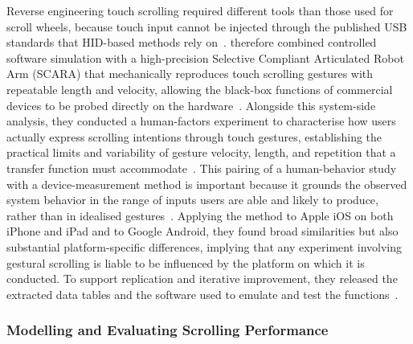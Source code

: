 \documentclass[12pt,a4paper]{report}
\begin{document}
        Reverse engineering touch scrolling required different tools than those used for scroll wheels, because touch input cannot be injected through the published USB standards that HID-based methods rely on~\cite{quinn2013touch}. \citeauthor{quinn2013touch} therefore combined controlled software simulation with a high-precision Selective Compliant Articulated Robot Arm (SCARA) that mechanically reproduces touch scrolling gestures with repeatable length and velocity, allowing the black-box functions of commercial devices to be probed directly on the hardware~\cite{quinn2013touch}. Alongside this system-side analysis, they conducted a human-factors experiment to characterise how users actually express scrolling intentions through touch gestures, establishing the practical limits and variability of gesture velocity, length, and repetition that a transfer function must accommodate~\cite{quinn2013touch}. This pairing of a human-behavior study with a device-measurement method is important because it grounds the observed system behavior in the range of inputs users are able and likely to produce, rather than in idealised gestures~\cite{quinn2013touch}. Applying the method to Apple iOS on both iPhone and iPad and to Google Android, they found broad similarities but also substantial platform-specific differences, implying that any experiment involving gestural scrolling is liable to be influenced by the platform on which it is conducted. To support replication and iterative improvement, they released the extracted data tables and the software used to emulate and test the functions~\cite{quinn2013touch}.



        \subsubsection{Modelling and Evaluating Scrolling Performance}
\end{document}
